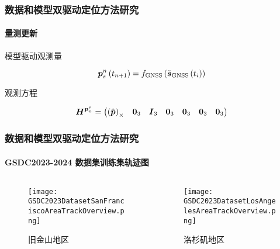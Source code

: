 \begin{frame}
	\frametitle{数据和模型双驱动定位方法研究}	
	\framesubtitle{量测更新}	
	{\small
		模型驱动观测量
		
		\begin{equation*}
			\vb*{p}_{s}^{n}\left(t_{n+1}\right)
			=
			f_{\mathrm{GNSS}}\left(\tilde{\vb*{s}}_{\mathrm{GNSS}}\left(t_i\right)\right)
		\end{equation*}
				
		观测方程
		
		\begin{equation*}
			\vb*{H}^{\vb*{p}^s_{n}} 
			= 
			\begin{pmatrix}
				\left(\hat{\vb*{p}}\right)_{\times}
				&\vb*{0}_3
				&\vb*{I}_3
				&\vb*{0}_3
				&\vb*{0}_3
				&\vb*{0}_3
				&\vb*{0}_3
			\end{pmatrix}
		\end{equation*}    
	} 
\end{frame}

 \begin{frame} 
 	\frametitle{数据和模型双驱动定位方法研究}
 	\framesubtitle{GSDC2023-2024 数据集训练集轨迹图}
	\begin{columns}
		\begin{column}{0.5\textwidth}
		   	\begin{figure}
			    \texttt{[image: GSDC2023DatasetSanFranciscoAreaTrackOverview.png]}
			    \caption{旧金山地区}
		   	\end{figure} 
		\end{column}   
		\begin{column}{0.5\textwidth}
		   	\begin{figure}
			    \texttt{[image: GSDC2023DatasetLosAngelesAreaTrackOverview.png]}
			    \caption{洛杉矶地区}
		   	\end{figure} 
		\end{column}
	\end{columns} 
\end{frame}
 
